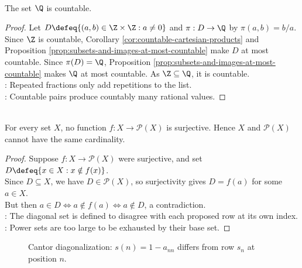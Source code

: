 \begin{corollary} \label{cor:rationals-countable} \\
The set $\Q$ is countable.
\begin{proof}
Let $D\defeq\{(a,b)\in\Z\times\Z:a\neq0\}$ and $\pi:D\to\Q$ by $\pi(a,b)=b/a$.\\
Since $\Z$ is countable, Corollary \ref{cor:countable-cartesian-products} and Proposition \ref{prop:subsets-and-images-at-most-countable} make $D$ at most countable. Since $\pi(D)=\Q$, Proposition \ref{prop:subsets-and-images-at-most-countable} makes $\Q$ at most countable. As $\Z\subseteq\Q$, it is countable.\\
: Repeated fractions only add repetitions to the list.\\
: Countable pairs produce countably many rational values.
\end{proof}
\end{corollary}

\begin{theorem} \label{thm:cantor-power-set-theorem} \\
For every set $X$, no function $f:X\to\mathcal{P}(X)$ is surjective. Hence $X$ and $\mathcal{P}(X)$ cannot have the same cardinality.
\begin{proof}
Suppose $f:X\to\mathcal{P}(X)$ were surjective, and set $D\defeq\{x\in X:x\notin f(x)\}$.\\
Since $D\subseteq X$, we have $D\in\mathcal{P}(X)$, so surjectivity gives $D=f(a)$ for some $a\in X$.\\
But then $a\in D \Longleftrightarrow a\notin f(a) \Longleftrightarrow a\notin D$, a contradiction.\\
: The diagonal set is defined to disagree with each proposed row at its own index.\\
: Power sets are too large to be exhausted by their base set.
\end{proof}
\end{theorem}

\begin{figure}[H]
  \centering
  
  \caption{Cantor diagonalization: $s(n)=1-a_{nn}$ differs from row $s_n$ at position $n$.}
  \label{fig:cantor-diagonal-binary-sequences}
\end{figure}


